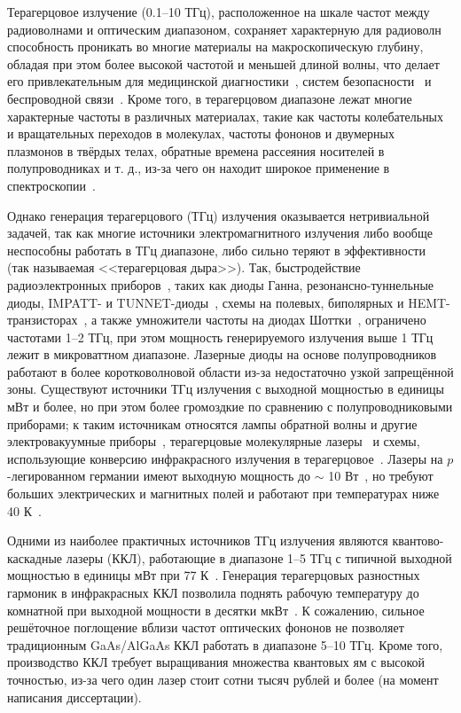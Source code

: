 {\actuality} 
Терагерцовое излучение (0.1--10 ТГц), расположенное на шкале частот между радиоволнами и оптическим диапазоном, сохраняет характерную для радиоволн способность проникать во многие материалы на макроскопическую глубину, обладая при этом более высокой частотой и меньшей длиной волны, что делает его привлекательным для медицинской диагностики~\cite{THz_medicine}, систем безопасности~\cite{THz_security} и беспроводной связи~\cite{THz_WiFi}. Кроме того, в терагерцовом диапазоне лежат многие характерные частоты в различных материалах, такие как частоты колебательных и вращательных переходов в молекулах, частоты фононов и двумерных плазмонов в твёрдых телах, обратные времена рассеяния носителей в полупроводниках и т. д., из-за чего он находит широкое применение в спектроскопии~\cite{THz_spectroscopy1,THz_spectroscopy2}.

Однако генерация терагерцового (ТГц) излучения оказывается нетривиальной задачей, так как многие источники электромагнитного излучения либо вообще неспособны работать в ТГц диапазоне, либо сильно теряют в эффективности~\cite{THz_gap} (так называемая <<терагерцовая дыра>>). Так, быстродействие радиоэлектронных приборов~\cite{THz_solid-state_sources}, таких как диоды Ганна, резонансно-туннельные диоды, IMPATT- и TUNNET-диоды~\cite{THz_diode_sources}, схемы на полевых, биполярных и HEMT-транзисторах~\cite{THz_transistor_sources}, а также умножители частоты на диодах Шоттки~\cite{THz_multipliers}, ограничено частотами 1--2 ТГц, при этом мощность генерируемого излучения выше 1 ТГц лежит в микроваттном диапазоне. Лазерные диоды на основе полупроводников \AIIIBV{} работают в более коротковолновой области из-за недостаточно узкой запрещённой зоны. Существуют источники ТГц излучения с выходной мощностью в единицы мВт и более, но при этом более громоздкие по сравнению с полупроводниковыми приборами; к таким источникам относятся лампы обратной волны и другие электровакуумные приборы~\cite{THz_vacuum_electronics}, терагерцовые молекулярные лазеры~\cite{THz_molecular_lasers} и схемы, использующие конверсию инфракрасного излучения в терагерцовое~\cite{THz_nonlinear_crystals,THz_sources_review}. Лазеры на $p$-легированном германии имеют выходную мощность до $\sim$ 10 Вт~\cite{p_Ge_output_power}, но требуют больших электрических и магнитных полей и работают при температурах ниже 40 К~\cite{p-Ge_review}.

Одними из наиболее практичных источников ТГц излучения являются квантово-каскадные лазеры (ККЛ), работающие в диапазоне 1--5 ТГц с типичной выходной мощностью в единицы мВт при 77 К~\cite{QCL_review,THz_QCL_review_output_power_plots}. Генерация терагерцовых разностных гармоник в инфракрасных ККЛ позволила поднять рабочую температуру до комнатной при выходной мощности в десятки мкВт~\cite{THz_QCL_DFG}. К сожалению, сильное решёточное поглощение вблизи частот оптических фононов не позволяет традиционным GaAs/AlGaAs ККЛ работать в диапазоне 5--10 ТГц. Кроме того, производство ККЛ требует выращивания множества квантовых ям с высокой точностью, из-за чего один лазер стоит сотни тысяч рублей и более (на момент написания диссертации).

